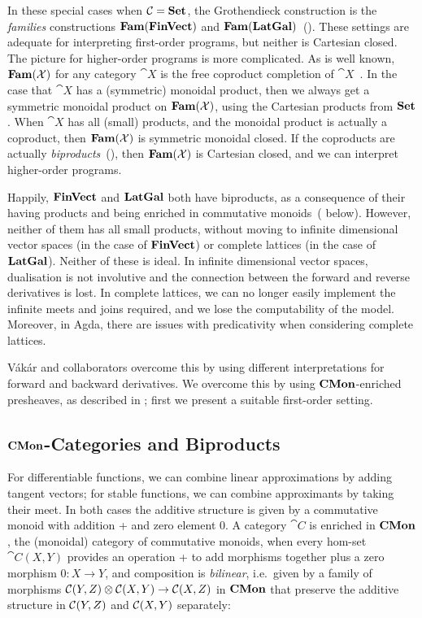 In these special cases when $\mathcal{C} = \mathbf{Set}$, the Grothendieck construction is the {\em families} constructions $\mathbf{Fam}(\mathbf{FinVect})$ and $\mathbf{Fam}(\mathbf{LatGal})$~(). These settings are adequate for interpreting first-order programs, but neither is Cartesian closed. The picture for higher-order programs is more complicated. As is well known, $\mathbf{Fam}(\mathcal{X})$ for any category $\cat{X}$ is the free coproduct completion of $\cat{X}$~\cite{lawvere63}. In the case that $\cat{X}$ has a (symmetric) monoidal product, then we always get a symmetric monoidal product on $\mathbf{Fam}(\mathcal{X})$, using the Cartesian products from $\mathbf{Set}$. When $\cat{X}$ has all (small) products, and the monoidal product is actually a coproduct, then $\mathbf{Fam}(\mathcal{X})$ is symmetric monoidal closed. If the coproducts are actually {\em biproducts}~(), then $\mathbf{Fam}(\mathcal{X})$ is Cartesian closed, and we can interpret higher-order programs.

Happily, $\mathbf{FinVect}$ and $\mathbf{LatGal}$ both have biproducts, as a consequence of their having products and being enriched in commutative monoids~( below). However, neither of them has all small products, without moving to infinite dimensional vector spaces (in the case of $\mathbf{FinVect}$) or complete lattices (in the case of $\mathbf{LatGal}$). Neither of these is ideal. In infinite dimensional vector spaces, dualisation is not involutive and the connection between the forward and reverse derivatives is lost. In complete lattices, we can no longer easily implement the infinite meets and joins required, and we lose the computability of the model. Moreover, in Agda, there are issues with predicativity when considering complete lattices. 

Vákár and collaborators overcome this by using different interpretations for forward and backward derivatives. We overcome this by using $\mathbf{CMon}$-enriched presheaves, as described in ; first we present a suitable first-order setting.

\subsection{$\mathbf{CMon}$-Categories and Biproducts}
\label{sec:biproducts}

For differentiable functions, we can combine linear approximations by adding tangent vectors; for stable
functions, we can combine approximants by taking their meet. In both cases the additive structure is given by
a commutative monoid with addition + and zero element 0. A category $\cat{C}$ is enriched in $\mathbf{CMon}$, the
(monoidal) category of commutative monoids, when every hom-set $\cat{C}(X,Y)$ provides an operation + to add
morphisms together plus a zero morphism $0: X \to Y$, and composition is \emph{bilinear}, i.e.~given by a
family of morphisms ${\mathcal{C}}(Y,Z) \otimes {\mathcal{C}}(X,Y) \to {\mathcal{C}}(X,Z)$ in $\mathbf{CMon}$ that
preserve the additive structure in ${\mathcal{C}}(Y,Z)$ and ${\mathcal{C}}(X,Y)$ separately:

